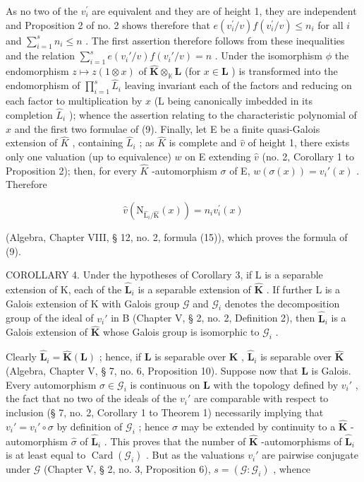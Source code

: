 As no two of the \(v_{i}^{\prime}\) are equivalent and they are of height 1, they are independent and Proposition 2 of no. 2 shows therefore that \(e(v_{i}^{\prime}/v)f(v_{i}^{\prime}/v) \leqslant n_{i}\) for all \(i\) and \(\sum_{i=1}^{s} n_i \leqslant n\) . The first assertion therefore follows from these inequalities and the relation \(\sum_{i=1}^{s} e(v_i'/v) f(v_i'/v) = n\) . Under the isomorphism \(\phi\) the endomorphism \(z \mapsto z(1 \otimes x)\) of \(\hat{\mathbf{K}} \otimes_{\mathbb{K}} \mathbf{L}\) (for \(x \in \mathbf{L}\) ) is transformed into the endomorphism of \(\prod_{i=1}^{s}\hat{L}_i\) leaving invariant each of the factors and reducing on each factor to multiplication by \(x\) (L being canonically imbedded in its completion \(\hat{L}_i\) ); whence the assertion relating to the characteristic polynomial of \(x\) and the first two formulae of (9). Finally, let E be a finite quasi-Galois extension of \(\hat{K}\) , containing \(\hat{L}_i\) ; as \(\hat{K}\) is complete and \(\hat{v}\) of height 1, there exists only one valuation (up to equivalence) \(w\) on E extending \(\hat{v}\) (no. 2, Corollary 1 to Proposition 2); then, for every \(\hat{K}\) -automorphism \(\sigma\) of E, \(w(\sigma(x)) = v_i'(x)\) . Therefore

\[
\hat {v} \left(\mathrm{N} _ {\hat {\mathrm{L}} _ {i} / \hat {\mathrm{K}}} (x)\right) = n _ {i} v _ {i} ^ {\prime} (x)
\]

(Algebra, Chapter VIII, § 12, no. 2, formula (15)), which proves the formula of (9).

COROLLARY 4. Under the hypotheses of Corollary 3, if L is a separable extension of K, each of the \(\hat{\mathbf{L}}_i\) is a separable extension of \(\hat{\mathbf{K}}\) . If further L is a Galois extension of K with Galois group \(\mathcal{G}\) and \(\mathcal{G}_i\) denotes the decomposition group of the ideal of \(v_i'\) in B (Chapter V, § 2, no. 2, Definition 2), then \(\hat{\mathbf{L}}_i\) is a Galois extension of \(\hat{\mathbf{K}}\) whose Galois group is isomorphic to \(\mathcal{G}_i\) .

Clearly \(\hat{\mathbf{L}}_i = \hat{\mathbf{K}}(\mathbf{L})\) ; hence, if \(\mathbf{L}\) is separable over \(\mathbf{K}\) , \(\hat{\mathbf{L}}_i\) is separable over \(\hat{\mathbf{K}}\) (Algebra, Chapter V, § 7, no. 6, Proposition 10). Suppose now that \(\mathbf{L}\) is Galois. Every automorphism \(\sigma \in \mathcal{G}_i\) is continuous on \(\mathbf{L}\) with the topology defined by \(v_i'\) , the fact that no two of the ideals of the \(v_i'\) are comparable with respect to inclusion (§ 7, no. 2, Corollary 1 to Theorem 1) necessarily implying that \(v_i' = v_i' \circ \sigma\) by definition of \(\mathcal{G}_i\) ; hence \(\sigma\) may be extended by continuity to a \(\hat{\mathbf{K}}\) -automorphism \(\hat{\sigma}\) of \(\hat{\mathbf{L}}_i\) . This proves that the number of \(\hat{\mathbf{K}}\) -automorphisms of \(\hat{\mathbf{L}}_i\) is at least equal to \(\operatorname{Card}(\mathcal{G}_i)\) . But as the valuations \(v_i'\) are pairwise conjugate under \(\mathcal{G}\) (Chapter V, § 2, no. 3, Proposition 6), \(s = (\mathcal{G}: \mathcal{G}_i)\) , whence

